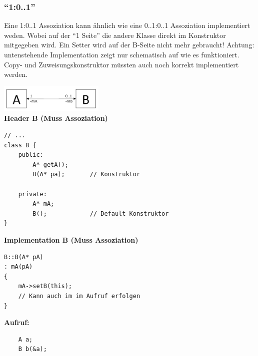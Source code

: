 \subsubsection{"`1:0..1"'}
Eine 1:0..1 Assoziation kann ähnlich wie eine 0..1:0..1 Assoziation
implementiert weden. Wobei auf der "`1 Seite"' die andere Klasse direkt im
Konstruktor mitgegeben wird. Ein Setter wird auf der B-Seite nicht mehr
gebraucht! Achtung: untenstehende Implementation zeigt nur schematisch auf wie
es funktioniert. Copy- und Zuweisungskonstruktor müssten auch noch korrekt
implementiert werden.
\begin{multicols}{2}
\includegraphics[width=5cm]{./bilder/Assozi_1_01.png}\\
\textbf{Header B (Muss Assoziation)}
\begin{lstlisting}
// ...
class B {
	public: 
		A* getA();
		B(A* pa);		// Konstruktor
	
	private:
		A* mA;		
		B();			// Default Konstruktor
}
\end{lstlisting}
\columnbreak
\textbf{Implementation B (Muss Assoziation)}
\begin{lstlisting}
B::B(A* pA)
: mA(pA)
{
	mA->setB(this); 
	// Kann auch im im Aufruf erfolgen
}
\end{lstlisting}

\textbf{Aufruf:}
\begin{lstlisting}
	A a;
	B b(&a);
\end{lstlisting}
\end{multicols}

\newpage

